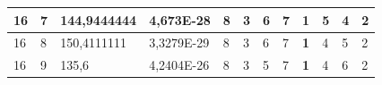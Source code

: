 \documentclass[conference]{IEEEtran}
\begin{document}
\begin{table}[]
\begin{tabular}{|llll|llllllll|}
\multicolumn{1}{|l|}{16}                                                             & \multicolumn{1}{l|}{7}                                                                 & \multicolumn{1}{l|}{144,9444444}                                                           & 4,673E-28                               & \multicolumn{1}{l|}{8}                                                           & \multicolumn{1}{l|}{3}                                                           & \multicolumn{1}{l|}{6}                                                           & \multicolumn{1}{l|}{7}                                                           & \multicolumn{1}{l|}{\textbf{1}}                                                  & \multicolumn{1}{l|}{5}                                                           & \multicolumn{1}{l|}{4}                                                           & 2                                   \\ \hline
\multicolumn{1}{|l|}{16}                                                             & \multicolumn{1}{l|}{8}                                                                 & \multicolumn{1}{l|}{150,4111111}                                                           & 3,3279E-29                              & \multicolumn{1}{l|}{8}                                                           & \multicolumn{1}{l|}{3}                                                           & \multicolumn{1}{l|}{6}                                                           & \multicolumn{1}{l|}{7}                                                           & \multicolumn{1}{l|}{\textbf{1}}                                                  & \multicolumn{1}{l|}{4}                                                           & \multicolumn{1}{l|}{5}                                                           & 2                                   \\ \hline
\multicolumn{1}{|l|}{16}                                                             & \multicolumn{1}{l|}{9}                                                                 & \multicolumn{1}{l|}{135,6}                                                                 & 4,2404E-26                              & \multicolumn{1}{l|}{8}                                                           & \multicolumn{1}{l|}{3}                                                           & \multicolumn{1}{l|}{5}                                                           & \multicolumn{1}{l|}{7}                                                           & \multicolumn{1}{l|}{\textbf{1}}                                                  & \multicolumn{1}{l|}{4}                                                           & \multicolumn{1}{l|}{6}                                                           & 2                                   \\ \hline

\end{tabular}
\end{table}
\end{document}
